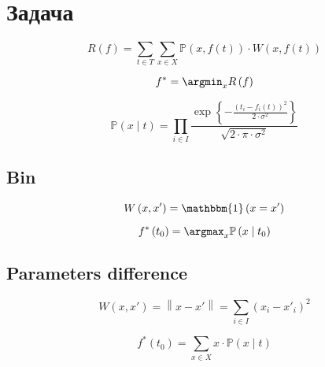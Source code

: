 \section{Задача}

\begin{equation*}
  R \left( f \right)
  = \sum\limits_{t \in T} \sum\limits_{x \in X}
    \mathbb{P} \left( x,  f\left( t \right) \right)
    \cdot W \left( x, f\left( t \right) \right)
\end{equation*}

\begin{equation*}
  f^* = \argmin_x R \left( f \right)
\end{equation*}

\begin{equation*}
  \mathbb{P}\left( x \mid t \right)
  = \prod_{i \in I}
    \frac{\exp{\left\{- \frac{\left( t_i - f_i\left( t \right) \right)^2}
         {2 \cdot \sigma^2} \right\}}}{\sqrt{2 \cdot \pi \cdot \sigma^2}}
\end{equation*}

\subsection{Bin}

\begin{equation*}
  W \left( x, x' \right)
  = \mathbbm{1} \left( x = x' \right)
\end{equation*}

\begin{equation*}
  f^* \left( t_0 \right)
  = \argmax_x \mathbb{P} \left( x \mid  t_0 \right)
\end{equation*}

\subsection{Parameters difference}

\begin{equation*}
  W \left( x, x' \right)
  = \left\| x - x' \right\|
  = \sum_{i \in I} \left( x_i - x'_i \right)^2
\end{equation*}

\begin{equation*}
  f^* \left( t_0 \right)
  = \sum_{x \in X} x \cdot \mathbb{P}\left( x \mid t\right)
\end{equation*}

